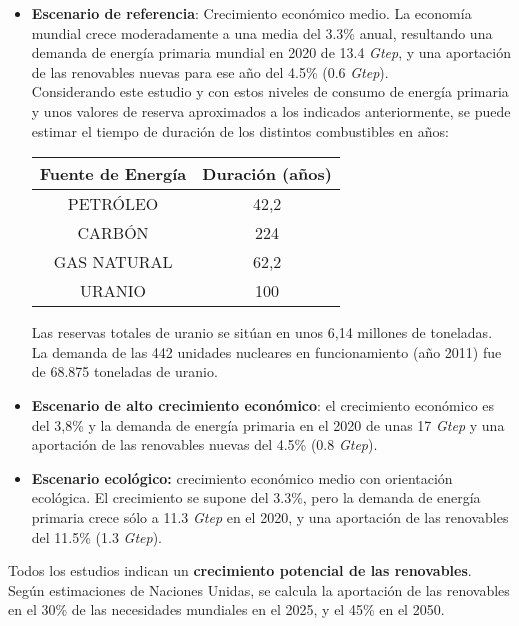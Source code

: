 			\begin{itemize}
				\item \textbf{Escenario de referencia}: 
					Crecimiento económico medio. La economía mundial crece
					moderadamente a una media del 3.3\% anual, resultando una demanda de energía primaria
					mundial en 2020 de 13.4 \textit{Gtep}, y una aportación de las renovables nuevas para ese año del 4.5\% (0.6 \textit{Gtep}).\\
					Considerando este estudio y con estos niveles de consumo de energía primaria y unos valores
					de reserva aproximados a los indicados anteriormente, se puede estimar el tiempo de duración de los
					distintos combustibles en años: 
					
					\begin{table}[h]
						\renewcommand{\arraystretch}{1.4}
						\centering
						\begin{tabular}{|c|c|}
							\hline
							\textbf{Fuente de Energía} & \textbf{Duración (años)} \\
							\hline
							PETRÓLEO & 42,2 \\
							\hline
							CARBÓN & 224 \\
							\hline
							GAS NATURAL & 62,2 \\
							\hline
							URANIO & 100 \\
							\hline
						\end{tabular}
					\end{table}
					
					Las reservas totales de uranio se sitúan en unos 6,14 millones de toneladas. La demanda de las 442 unidades
					nucleares en funcionamiento (año 2011) fue de 68.875 toneladas de uranio.
					
				\item \textbf{Escenario de alto crecimiento económico}: 
					el crecimiento económico es del 3,8\% y la demanda de energía primaria en el 2020 de unas 17 \textit{Gtep} y una aportación de las renovables nuevas del 4.5\% (0.8 \textit{Gtep}).
					
				\item \textbf{Escenario ecológico:} 
					crecimiento económico medio con orientación ecológica. El crecimiento se supone del 3.3\%, pero la demanda de energía primaria crece sólo a 11.3 \textit{Gtep} en el 2020, y una aportación de las renovables del 11.5\% (1.3 \textit{Gtep}).
			\end{itemize}

			\indent Todos los estudios indican un \textbf{crecimiento potencial de las renovables}. Según estimaciones de Naciones Unidas, se calcula la aportación de las renovables en el 30\% de las necesidades mundiales
			en el 2025, y el 45\% en el 2050.
		

